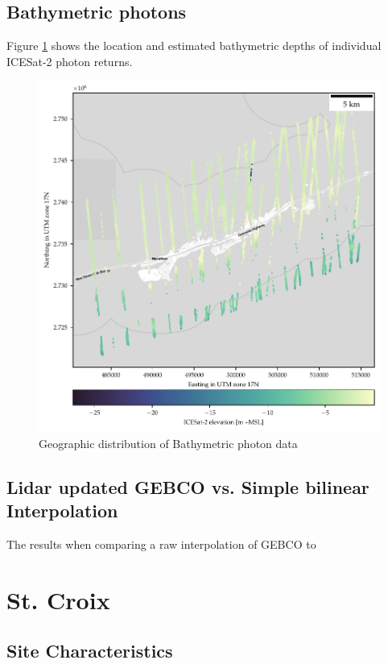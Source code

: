 \subsection{Bathymetric photons}
Figure \ref{fig:bathyphotonmap} shows the location and estimated bathymetric depths of individual ICESat-2 photon returns.
\begin{figure}[h]
    \centering
    \includegraphics{figures/Florida_keys_photon_map.pdf}
    \caption{Geographic distribution of Bathymetric photon data}
    \label{fig:bathyphotonmap}
\end{figure}

\subsection{Lidar updated GEBCO vs. Simple bilinear Interpolation}
The results when comparing a raw interpolation of GEBCO to
% 



\section{St. Croix}

\subsection{Site Characteristics}

